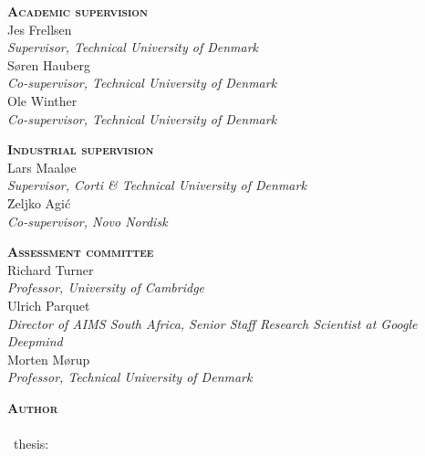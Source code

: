 

\thispagestyle{empty} %

\hfill\vfill

\noindent
\small%
\textsc{\textbf{Academic supervision}}
\medskip
\\Jes Frellsen\\
\textit{Supervisor, Technical University of Denmark}
\medskip
\\Søren Hauberg\\
\textit{Co-supervisor, Technical University of Denmark}
\medskip
\\Ole Winther\\
\textit{Co-supervisor, Technical University of Denmark}
\medskip

\bigskip
\noindent
\textsc{\textbf{Industrial supervision}}
\medskip
\\Lars Maaløe\\
\textit{Supervisor, Corti \& Technical University of Denmark}
\medskip
\\\u{Z}eljko Agi\'c\\
\textit{Co-supervisor, Novo Nordisk}
\medskip

\bigskip
\noindent
\textsc{\textbf{Assessment committee}}
\medskip
\\Richard Turner\\
\textit{Professor, University of Cambridge}
\medskip
\\Ulrich Parquet\\
\textit{Director of AIMS South Africa, Senior Staff Research Scientist at Google Deepmind}
\medskip
\\Morten Mørup\\
\textit{Professor, Technical University of Denmark} %
\medskip

\bigskip
\noindent
\textsc{\textbf{Author}}
\medskip
\\\thesisauthor\\
\thesistypeabbr\ thesis:\\
\textit{\thesistitle}\\
\textcopyright\ \thesismonth\ \thesisyear

\normalsize
\normalfont
